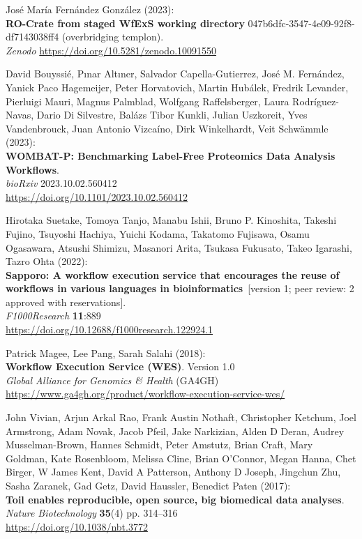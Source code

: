 \documentclass[10pt,letterpaper]{article}
\begin{document}
\begin{thebibliography}{10}
\begin{small}
José María Fernández González (2023):\\
\textbf{RO-Crate from staged WfExS working directory} 047b6dfc-3547-4e09-92f8-df7143038ff4 (overbridging templon).\\
\emph{Zenodo}
\url{https://doi.org/10.5281/zenodo.10091550}

David Bouyssié, Pınar Altıner, Salvador Capella-Gutierrez, José M. Fernández, Yanick Paco Hagemeijer, Peter Horvatovich, Martin Hubálek, Fredrik Levander, Pierluigi Mauri, Magnus Palmblad, Wolfgang Raffelsberger, Laura Rodríguez-Navas, Dario Di Silvestre, Balázs Tibor Kunkli, Julian Uszkoreit, Yves Vandenbrouck, Juan Antonio Vizcaíno, Dirk Winkelhardt, Veit Schwämmle (2023):\\
\textbf{WOMBAT-P: Benchmarking Label-Free Proteomics Data Analysis Workflows}.\\
\emph{bioRxiv} 2023.10.02.560412 \\
\url{https://doi.org/10.1101/2023.10.02.560412}

 Hirotaka Suetake, Tomoya Tanjo, Manabu Ishii, Bruno
P. Kinoshita, Takeshi Fujino, Tsuyoshi Hachiya, Yuichi Kodama, Takatomo
Fujisawa, Osamu Ogasawara, Atsushi Shimizu, Masanori Arita, Tsukasa
Fukusato, Takeo Igarashi, Tazro Ohta (2022):\\
\textbf{Sapporo: A workflow execution service that encourages the reuse
of workflows in various languages in bioinformatics}~[version 1; peer review: 2 approved with reservations].\\
\emph{F1000Research} \textbf{11}:889\\
\url{https://doi.org/10.12688/f1000research.122924.1}

Patrick Magee, Lee Pang, Sarah Salahi (2018):\\
\textbf{Workflow Execution Service (WES)}. Version 1.0\\
\emph{Global Alliance for Genomics \& Health} (GA4GH)\\
\url{https://www.ga4gh.org/product/workflow-execution-service-wes/}

John Vivian, Arjun Arkal Rao, Frank Austin Nothaft, Christopher Ketchum, Joel Armstrong, Adam Novak, Jacob Pfeil, Jake Narkizian, Alden D Deran, Audrey Musselman-Brown, Hannes Schmidt, Peter Amstutz, Brian Craft, Mary Goldman, Kate Rosenbloom, Melissa Cline, Brian O'Connor, Megan Hanna, Chet Birger, W James Kent, David A Patterson, Anthony D Joseph, Jingchun Zhu, Sasha Zaranek, Gad Getz, David Haussler, Benedict Paten (2017):\\
\textbf{Toil enables reproducible, open source, big biomedical data analyses}.\\
\emph{Nature Biotechnology} \textbf{35}(4) pp. 314--316 \\
\url{https://doi.org/10.1038/nbt.3772}


\end{small}
\end{thebibliography}
\end{document}
